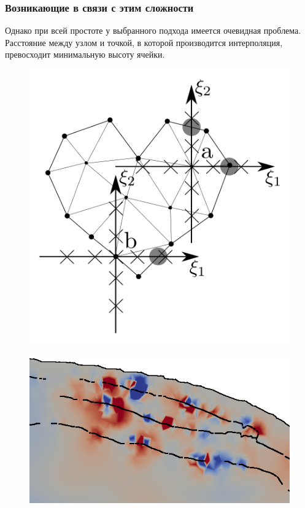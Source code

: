 \documentclass[a4paper]{article}
\numberwithin{equation}{section}
\begin{document}
\subsubsection{Возникающие в связи с этим сложности}
Однако при всей простоте у выбранного подхода имеется очевидная проблема. 
Расстояние между узлом и точкой, в которой производится интерполяция, 
превосходит минимальную высоту ячейки. 
\begin{figure}
\centering
\begin{minipage}{.5\textwidth}
  \centering
  \includegraphics[width=.8\linewidth]{pictures/gcm-on-triangles-non-courant.png}
  \label{pic:gcm-on-triangles-non-courant}
\end{minipage}%
\hfill
\begin{minipage}{.5\textwidth}
  \centering
  \includegraphics[width=.8\linewidth]{pictures/skull/oscillations.png}
  \label{pic:oscillations}
\end{minipage}
\end{figure}
\end{document}
